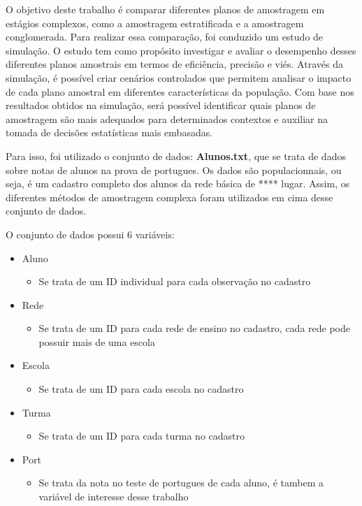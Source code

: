 \documentclass[sn-basic,pdflatex]{sn-jnl}
\theoremstyle{remark}
\theoremstyle{definition}
\providecommand{\tightlist}{%
  \setlength{\itemsep}{0pt}\setlength{\parskip}{0pt}}
\begin{document}
O objetivo deste trabalho é comparar diferentes planos de amostragem em
estágios complexos, como a amostragem estratificada e a amostragem
conglomerada. Para realizar essa comparação, foi conduzido um estudo de
simulação. O estudo tem como propósito investigar e avaliar o desempenho
desses diferentes planos amostrais em termos de eficiência, precisão e
viés. Através da simulação, é possível criar cenários controlados que
permitem analisar o impacto de cada plano amostral em diferentes
características da população. Com base nos resultados obtidos na
simulação, será possível identificar quais planos de amostragem são mais
adequados para determinados contextos e auxiliar na tomada de decisões
estatísticas mais embasadas.

Para isso, foi utilizado o conjunto de dados: \textbf{Alunos.txt}, que
se trata de dados sobre notas de alunos na prova de portugues. Os dados
são populacionnais, ou seja, é um cadastro completo dos alunos da rede
básica de **** lugar. Assim, os diferentes métodos de amostragem
complexa foram utilizados em cima desse conjunto de dados.

O conjunto de dados possui 6 variáveis:

\begin{itemize}
\tightlist
\item
  Aluno

  \begin{itemize}
  \tightlist
  \item
    Se trata de um ID individual para cada observação no cadastro
  \end{itemize}
\item
  Rede

  \begin{itemize}
  \tightlist
  \item
    Se trata de um ID para cada rede de ensino no cadastro, cada rede
    pode possuir mais de uma escola
  \end{itemize}
\item
  Escola

  \begin{itemize}
  \tightlist
  \item
    Se trata de um ID para cada escola no cadastro
  \end{itemize}
\item
  Turma

  \begin{itemize}
  \tightlist
  \item
    Se trata de um ID para cada turma no cadastro
  \end{itemize}
\item
  Port

  \begin{itemize}
  \tightlist
  \item
    Se trata da nota no teste de portugues de cada aluno, é tambem a
    variável de interesse desse trabalho
  \end{itemize}
\end{itemize}
\end{document}
